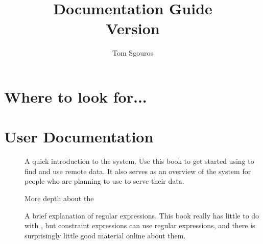 \documentclass{dods-paper}
\newcommand{\DOCversion}{Version \rcsInfoRevision}
\begin{document}
\title{\opendap Documentation Guide\\\DOCversion}
\author{Tom Sgouros}
\maketitle


\W{}

\tableofcontents

\section{Where to look for...}



\section{User Documentation}

\begin{description}

\item[\OPDquick]  A quick introduction to the \opendap system.  Use
  this book to get started using \opendap to find and use remote
  data.  It also serves as an overview of the system for people who
  are planning to use \opendap to serve their data.

\item[\OPDuser] More depth about the

\item[\OPDinstall]
  
\item[\OPDmgui]

\item[\OPDagg]

\item[\OPDapi]

\item[\OPDapiref]

\item[\OPDwclient]

\item[\OPDwserver]

\item[\OPDffbook]

\item[\OPDregex] A brief explanation of regular expressions.  This
  book really has little to do with \opendap, but \opendap constraint
  expressions can use regular expressions, and there is surprisingly
  little good material online about them.

\end{description}
\end{document}

